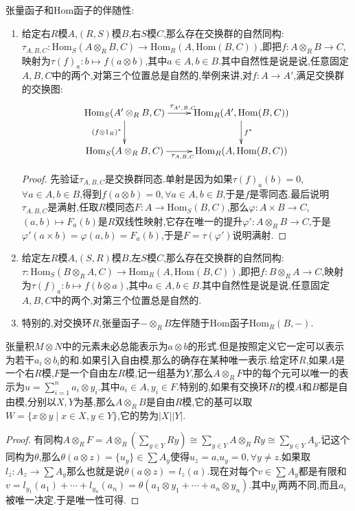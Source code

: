 张量函子和Hom函子的伴随性:
\begin{enumerate}
	\item 给定右$R$模$A$,$(R,S)$模$B$,右$S$模$C$,那么存在交换群的自然同构:
	$\tau_{A,B,C}:\mathrm{Hom}_S(A\otimes_RB,C)\to\mathrm{Hom}_R(A,\mathrm{Hom}(B,C))$,即把$f:A\otimes_RB\to C$,映射为$\tau(f)_a:b\mapsto f(a\otimes b)$,其中$a\in A,b\in B$.其中自然性是说是说,任意固定$A,B,C$中的两个,对第三个位置总是自然的,举例来讲,对$f:A\to A'$,满足交换群的交换图:
	$$\xymatrix{
		\mathrm{Hom}_S(A'\otimes_RB,C)\ar[r]^{\tau_{A',B,C}}\ar[d]_{(f\otimes 1_B)^*}&\mathrm{Hom}_R(A',\mathrm{Hom}(B,C))\ar[d]^{f^*}\\
		\mathrm{Hom}_S(A\otimes_RB,C)\ar[r]_{\tau_{A,B,C}}&\mathrm{Hom}_R(A,\mathrm{Hom}(B,C))
	}$$
    \begin{proof}
    	
    	先验证$\tau_{A,B,C}$是交换群同态.单射是因为如果$\tau(f)_a(b)=0$,$\forall a\in A,b\in B$,得到$f(a\otimes b)=0,\forall a\in A,b\in B$,于是$f$是零同态.最后说明$\tau_{A,B,C}$是满射,任取$R$模同态$F:A\to\mathrm{Hom}_S(B,C)$,那么$\varphi:A\times B\to C$,$(a,b)\mapsto F_a(b)$是$R$双线性映射,它存在唯一的提升$\varphi':A\otimes_RB\to C$,于是$\varphi'(a\times b)=\varphi(a,b)=F_a(b)$,于是$F=\tau(\varphi')$说明满射.
    \end{proof}
	\item 给定左$R$模$A$,$(S,R)$模$B$,左$S$模$C$,那么存在交换群的自然同构:
	$\tau:\mathrm{Hom}_S(B\otimes_RA,C)\to\mathrm{Hom}_R(A,\mathrm{Hom}(B,C))$,即把$f:B\otimes_RA\to C$,映射为$\tau(f)_a:b\mapsto f(b\otimes a)$,其中$a\in A,b\in B$.其中自然性是说是说,任意固定$A,B,C$中的两个,对第三个位置总是自然的.
	\item 特别的,对交换环$R$,张量函子$-\otimes_RB$左伴随于Hom函子$\mathrm{Hom}_R(B,-)$.
\end{enumerate}

张量积$M\otimes N$中的元素未必总能表示为$a\otimes b$的形式.但是按照定义它一定可以表示为若干$a_i\otimes b_i$的和.如果引入自由模,那么的确存在某种唯一表示.给定环$R$,如果$A$是一个右$R$模,$F$是一个自由左$R$模,记一组基为$Y$,那么$A\otimes_RF$中的每个元可以唯一的表示为$u=\sum_{i=1}^{n}a_i\otimes y_i$.其中$a_i\in A,y_i\in F$.特别的,如果有交换环$R$的模$A$和$B$都是自由模,分别以$X,Y$为基,那么$A\otimes_RB$是自由$R$模,它的基可以取$W=\{x\otimes y\mid x\in X,y\in Y\}$,它的势为$|X||Y|$.
\begin{proof}
	
	有同构$A\otimes_RF=A\otimes_R(\sum_{y\in Y}Ry)\cong\sum_{y\in Y}A\otimes_RRy\cong\sum_{y\in Y}A_y$.记这个同构为$\theta$,那么$\theta(a\otimes z)=\{u_y\}\in\sum A_y$使得$u_z=a$,$u_y=0,\forall y\not=z$.如果取$l_z:A_z\to\sum A_y$那么也就是说$\theta(a\otimes z)=l_z(a)$.现在对每个$v\in\sum A_y$都是有限和$v=l_{y_1}(a_1)+\cdots+l_{y_n}(a_n)=\theta(a_1\otimes y_1+\cdots+a_n\otimes y_n)$.其中$y_i$两两不同,而且$a_i$被唯一决定.于是唯一性可得.
\end{proof}

